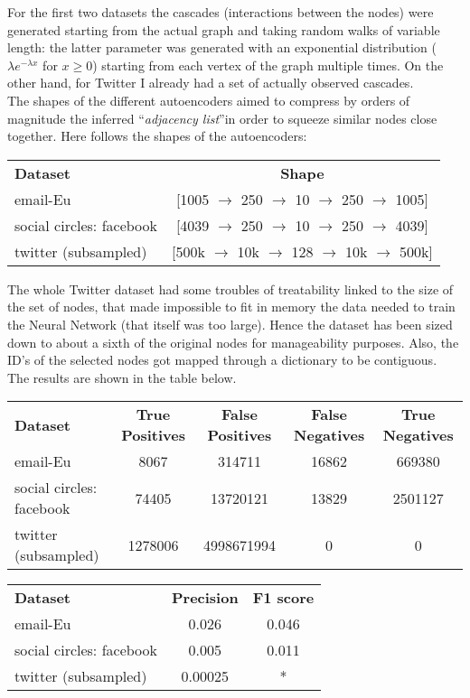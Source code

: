 \documentclass{article}
\begin{document}
				\bigskip
				For the first two datasets the cascades (interactions between the nodes) were generated starting from the actual graph and taking random walks of variable length: the latter parameter was generated with an exponential distribution ($\lambda e^{-\lambda x}$ for $x\ge 0$) starting from each vertex of the graph multiple times. On the other hand, for Twitter I already had a set of actually observed cascades.\smallskip\\
				The shapes of the different autoencoders aimed to compress by orders of magnitude the inferred \textquotedblleft \textit{adjacency list}\textquotedblright in order to squeeze similar nodes close together. Here follows the shapes of the autoencoders:
				\begin{center}
					\begin{tabular}{l | c}
						\textbf{Dataset} & \textbf{Shape} \\
						email-Eu & [1005 $\rightarrow$ 250 $\rightarrow$ 10 $\rightarrow$ 250 $\rightarrow$ 1005] \\
						social circles: facebook & [4039 $\rightarrow$ 250 $\rightarrow$ 10 $\rightarrow$ 250 $\rightarrow$ 4039]  \\
						twitter (subsampled) & [500k $\rightarrow$ 10k $\rightarrow$ 128 $\rightarrow$ 10k $\rightarrow$ 500k]
					\end{tabular}	
				\end{center}
				The whole Twitter dataset had some troubles of treatability linked to the size of the set of nodes, that made impossible to fit in memory the data needed to train the Neural Network (that itself was too large). Hence the dataset has been sized down to about a sixth of the original nodes for manageability purposes. Also, the ID\textquoteright s of the selected nodes got mapped through a dictionary to be contiguous.\\
				The results are shown in the table below.
				
				\begin{center}
					\begin{tabular}{l | c | c | c | c }
						\textbf{Dataset} & \textbf{True Positives} & \textbf{False Positives} & \textbf{False Negatives} & \textbf{True Negatives}  \\
						email-Eu &  8067 & 314711 & 16862 & 669380\\
						social circles: facebook & 74405 &	13720121 & 13829 & 2501127\\
						twitter (subsampled) & 1278006 & 4998671994 & 0 & 0
					\end{tabular}	
				\end{center}
				\hskip0.0cm
				\begin{tabular}{l | c | c}
					\textbf{Dataset} & \textbf{Precision} & \textbf{F1 score} \\
					email-Eu &  0.026 & 0.046\\
					social circles: facebook & 0.005 &	0.011\\
					twitter (subsampled) & 0.00025 & *
				\end{tabular}	
			
\end{document}
